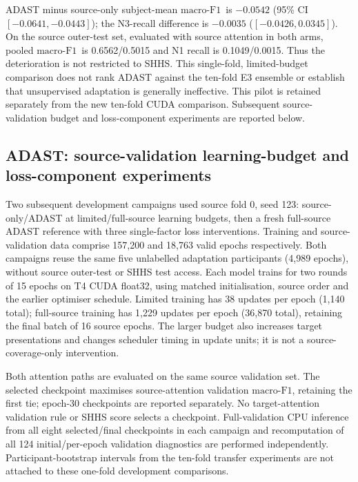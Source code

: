 \documentclass[10pt,a4paper]{article}
\newcommand{\mf}{\ensuremath{\mathrm{macro\text{-}F1}}}
\newcommand{\ci}{95\% CI}
\begin{document}
ADAST minus source-only subject-mean \mf\ is $-0.0542$ (\ci\ $[-0.0641,-0.0443]$);
the N3-recall difference is $-0.0035$ ($[-0.0426,0.0345]$). On the source outer-test set,
evaluated with source attention in both arms, pooled \mf\ is 0.6562/0.5015 and N1 recall is
0.1049/0.0015. Thus the deterioration is not restricted to SHHS. This single-fold, limited-budget
comparison does not rank ADAST against the ten-fold E3 ensemble or establish that unsupervised
adaptation is generally ineffective. This pilot is retained separately from the new ten-fold
CUDA comparison. Subsequent source-validation budget and loss-component experiments are reported below.

\subsection*{ADAST: source-validation learning-budget and loss-component experiments}

Two subsequent development campaigns used source fold 0, seed 123: source-only/ADAST at
limited/full-source learning budgets, then a fresh full-source ADAST reference with three
single-factor loss interventions. Training and source-validation data comprise 157,200 and
18,763 valid epochs respectively. Both campaigns reuse the same five unlabelled adaptation
participants (4,989 epochs), without source outer-test or SHHS test access. Each model trains
for two rounds of 15 epochs on T4 CUDA float32, using matched initialisation, source order and
the earlier optimiser schedule. Limited training has 38 updates per epoch (1,140 total);
full-source training has 1,229 updates per epoch (36,870 total), retaining the final batch of
16 source epochs. The larger budget also increases target presentations and changes scheduler
timing in update units; it is not a source-coverage-only intervention.

Both attention paths are evaluated on the same source validation set. The selected checkpoint
maximises source-attention validation \mf, retaining the first tie; epoch-30 checkpoints are
reported separately. No target-attention validation rule or SHHS score selects a checkpoint.
Full-validation CPU inference from all eight selected/final checkpoints in each campaign and
recomputation of all 124 initial/per-epoch validation diagnostics are performed independently.
Participant-bootstrap intervals from the ten-fold transfer experiments are not attached to
these one-fold development comparisons.
\end{document}
